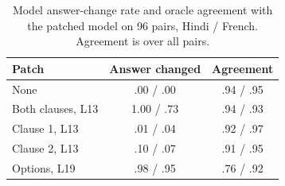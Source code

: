 \documentclass[11pt]{article}
\begin{document}
\begin{table}[t]
\small\centering
\begin{tabularx}{\linewidth}{@{}Xcc@{}}
\toprule
Patch & Answer changed & Agreement \\
\midrule
None & .00 / .00 & .94 / .95 \\
Both clauses, L13 & 1.00 / .73 & .94 / .93 \\
Clause 1, L13 & .01 / .04 & .92 / .97 \\
Clause 2, L13 & .10 / .07 & .91 / .95 \\
Options, L19 & .98 / .95 & .76 / .92 \\
\bottomrule
\end{tabularx}
\caption{Model answer-change rate and oracle agreement with the patched model on 96 pairs, Hindi / French. Agreement is over all pairs.}
\label{tab:oraclepatch}
\end{table}
\end{document}
